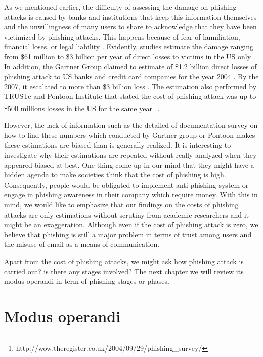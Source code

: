 As we mentioned earlier, the difficulty of assessing the damage on
phishing attacks is caused by banks and institutions that keep this
information themselves and the unwillingness of many users to share
to acknowledge that they have been victimized by phishing attacks.
This happens because of fear of humiliation, financial loses, or legal
liability \citep{jakobsson:2006}. Evidently, studies estimate the
damage ranging from \$61 million \citep{herley:2009} to \$3 billion
per year \citep{mccall2007gartner} of direct losses to victims in
the US only \citep{hong:2012}\citep{moura2009scalable}. In addition,
the Gartner Group claimed to estimate of \$1.2 billion direct losses
of phishing attack to US banks and credit card companies for the year
2004 \citep{litan2004phishing}. By the 2007, it escalated to more
than \$3 billion loss \citep{mccall2007gartner}. The estimation also
performed by TRUSTe and Pontoon Institute that stated the cost of
phishing attack was up to \$500 millions losses in the US for the
same year %
\footnote{http://wow.theregister.co.uk/2004/09/29/phishing\_survey/%
}.

However, the lack of information such as the detailed of documentation
survey on how to find these numbers which conducted by Gartner group
or Pontoon makes these estimations are biased than is generally realized.
It is interesting to investigate why their estimations are repeated
without really analyzed when they appeared biased at best. One thing
come up in our mind that they might have a hidden agenda to make societies
think that the cost of phishing is high. Consequently, people would
be obligated to implement anti phishing system or engage in phishing
awareness in their company which require money. With this in mind,
we would like to emphasize that our findings on the costs of phishing
attacks are only estimations without scrutiny from academic researchers
and it might be an exaggeration. Although even if the cost of phishing
attack is zero, we believe that phishing is still a major problem
in terms of trust among users and the misuse of email as a means of
communication.

Apart from the cost of phishing attacks, we might ask how phishing
attack is carried out? is there any stages involved? The next chapter
we will review its modus operandi in term of phishing stages or phases.


\section{Modus operandi}

